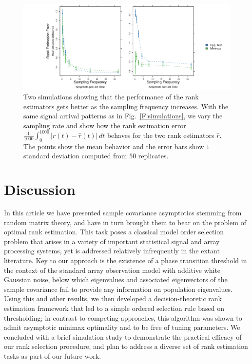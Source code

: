 \documentclass[final]{IEEEtran} %
\begin{document}
\begin{figure}
    \centering
    \includegraphics[width=2.1\columnwidth]{plots/consistency-sim}
    \caption{Two simulations showing that the performance of the rank estimators gets better as the sampling frequency increases.  With the same signal arrival patterns as in Fig.~\ref{F:simulations}, we vary the sampling rate and show how the rank estimation error $\frac{1}{1000} \int_0^{1000} |r(t) - \hat r(t)| \, dt$ behaves for the two rank estimators $\hat r$.  The points show the mean behavior and the error bars show $1$ standard deviation computed from $50$ replicates.}\label{F:consistency-sim} 
  \end{figure}

\section{Discussion}
\label{s:summ}

In this article we have presented sample covariance asymptotics stemming from random matrix theory, and have in turn brought them to bear on the problem of optimal rank estimation.  This task poses a classical model order selection problem that arises in a variety of important statistical signal and array processing systems, yet is addressed relatively infrequently in the extant literature.  Key to our approach is the existence of a phase transition threshold in the context of the standard array observation model with additive white Gaussian noise, below which eigenvalues and associated eigenvectors of the sample covariance fail to provide any information on population eigenvalues.  Using this and other results, we then developed a decision-theoretic rank estimation framework that led to a simple ordered selection rule based on thresholding; in contrast to competing approaches, this algorithm was shown to admit asymptotic minimax optimality and to be free of tuning parameters.  We concluded with a brief simulation study to demonstrate the practical efficacy of our rank selection procedure, and plan to address a diverse set of rank estimation tasks as part of our future work.
\end{document}
